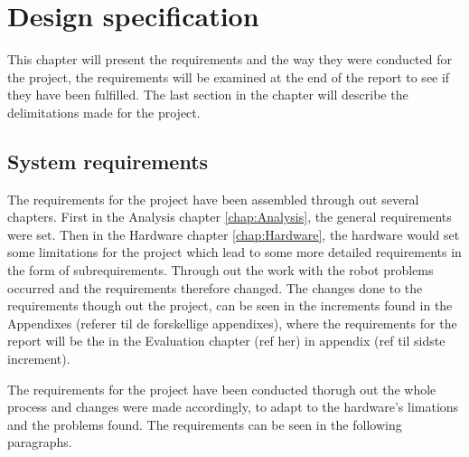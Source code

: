 \chapter{Design specification}
\label{chap:Design specification}
This chapter will present the requirements and the way they were conducted for the project, the requirements will be examined at the end of the report to see if they have been fulfilled. The last section in the chapter will describe the delimitations made for the project.

\section{System requirements}
\label{sec:System requirements}
The requirements for the project have been assembled through out several chapters. First in the Analysis chapter \ref{chap:Analysis}, the general requirements were set. Then in the Hardware chapter \ref{chap:Hardware}, the hardware would set some limitations for the project which lead to some more detailed requirements in the form of subrequirements.
Through out the work with the robot problems occurred and the requirements therefore changed. The changes done to the requirements though out the project, can be seen in the increments found in the Appendixes (referer til de forskellige appendixes), where the requirements for the report will be the in the Evaluation chapter (ref her) in appendix (ref til sidste increment).

The requirements for the project have been conducted thorugh out the whole process and changes were made accordingly, to adapt to the hardware's limations and the problems found. The requirements can be seen in the following paragraphs. 

